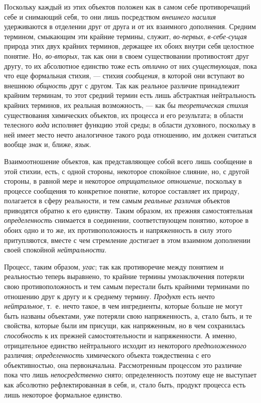 \documentclass[twoside]{article}
\begin{document}
{{{Поскольку каждый из этих объектов положен как в самом себе
противоречащий себе и снимающий себя, то они лишь посредством
{\em внешнего насилия}
удерживаются в отделении друг от друга и от их
взаимного дополнения. Средним термином, смыкающим эти
крайние термины, служит,
{\em во-первых},
{\em в-себе-сущая} природа
этих двух крайних терминов, держащее их обоих внутри себя целостное
понятие. Но, {\em во-вторых},
так как они в своем существовании противостоят друг другу, то
их абсолютное единство тоже есть
{\em отлично} от них
{\em существующая}, пока
что еще формальная стихия, — стихия
{\em сообщения}, в
которой они вступают во внешнюю
{\em общность} друг с
другом. Так как реальное различие принадлежит крайним терминам, то этот
средний термин есть лишь абстрактная нейтральность крайних терминов, их
реальная возможность, — как бы
{\em теоретическая стихия}
существования химических объектов, их процесса и его
результата; в области телесного
{\em вода} исполняет
функцию этой среды; в области духовного, поскольку в ней имеет место нечто
аналогичное такого рода отношению, им должен считаться вообще
{\em знак} и, ближе,
{\em язык}.

Взаимоотношение объектов, как представляющее собой всего лишь
сообщение в этой стихии, есть, с одной стороны, некоторое спокойное
слияние, но, с другой стороны, в равной мере и некоторое
{\em отрицательное отношение},
поскольку в процессе сообщения то конкретное понятие, которое
составляет их природу, полагается в сферу реальности, и тем самым
{\em реальные различия}
объектов приводятся обратно к его единству. Таким образом, их
прежняя самостоятельная
{\em определенность}
снимается в соединении, соответствующем понятию, которое в
обоих одно и то же, их противоположность и напряженность в силу этого
притупляются, вместе с чем стремление достигает в этом взаимном дополнении
своей спокойной {\em нейтральности}.

Процесс, таким образом,
{\em угас}; так как
противоречие между понятием и реальностью теперь выравнено, то крайние
термины умозаключения потеряли свою противоположность и тем самым перестали
быть крайними терминами по отношению друг к другу и к среднему термину.
{\em Продукт} есть нечто
{\em нейтральное}, т.~е.
нечто такое, в чем ингредиенты, которые больше не могут быть названы
объектами, уже потеряли свою напряженность, а, стало быть, и те свойства,
которые были им присущи, как напряженным, но в чем сохранилась
{\em способность} к их
прежней самостоятельности и напряженности. А именно, отрицательное единство
нейтрального исходит из некоторого
{\em предположенного}
различия;
{\em определенность}
химического объекта тождественна с его объективностью, она
первоначальна. Рассмотренным процессом это различие пока что лишь
{\em непосредственно}
снято; определенность поэтому еще не выступает
как абсолютно рефлектированная в себя, и, стало быть, продукт процесса есть
лишь некоторое формальное единство.

}}}
\end{document}
